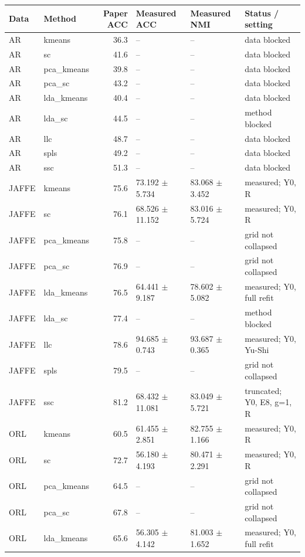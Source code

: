 \begin{longtable}{llrllp{2.9cm}}
\toprule Data & Method & Paper ACC & Measured ACC & Measured NMI & Status / setting \\
\midrule\endhead
AR & kmeans & 36.3 & -- & -- & data blocked \\
AR & sc & 41.6 & -- & -- & data blocked \\
AR & pca\_kmeans & 39.8 & -- & -- & data blocked \\
AR & pca\_sc & 43.2 & -- & -- & data blocked \\
AR & lda\_kmeans & 40.4 & -- & -- & data blocked \\
AR & lda\_sc & 44.5 & -- & -- & method blocked \\
AR & llc & 48.7 & -- & -- & data blocked \\
AR & spls & 49.2 & -- & -- & data blocked \\
AR & ssc & 51.3 & -- & -- & data blocked \\
JAFFE & kmeans & 75.6 & 73.192 $\pm$ 5.734 & 83.068 $\pm$ 3.452 & measured; Y0, R \\
JAFFE & sc & 76.1 & 68.526 $\pm$ 11.152 & 83.016 $\pm$ 5.724 & measured; Y0, R \\
JAFFE & pca\_kmeans & 75.8 & -- & -- & grid not collapsed \\
JAFFE & pca\_sc & 76.9 & -- & -- & grid not collapsed \\
JAFFE & lda\_kmeans & 76.5 & 64.441 $\pm$ 9.187 & 78.602 $\pm$ 5.082 & measured; Y0, full refit \\
JAFFE & lda\_sc & 77.4 & -- & -- & method blocked \\
JAFFE & llc & 78.6 & 94.685 $\pm$ 0.743 & 93.687 $\pm$ 0.365 & measured; Y0, Yu-Shi \\
JAFFE & spls & 79.5 & -- & -- & grid not collapsed \\
JAFFE & ssc & 81.2 & 68.432 $\pm$ 11.081 & 83.049 $\pm$ 5.721 & truncated; Y0, E8, g=1, R \\
ORL & kmeans & 60.5 & 61.455 $\pm$ 2.851 & 82.755 $\pm$ 1.166 & measured; Y0, R \\
ORL & sc & 72.7 & 56.180 $\pm$ 4.193 & 80.471 $\pm$ 2.291 & measured; Y0, R \\
ORL & pca\_kmeans & 64.5 & -- & -- & grid not collapsed \\
ORL & pca\_sc & 67.8 & -- & -- & grid not collapsed \\
ORL & lda\_kmeans & 65.6 & 56.305 $\pm$ 4.142 & 81.003 $\pm$ 1.652 & measured; Y0, full refit \\

\end{longtable}
